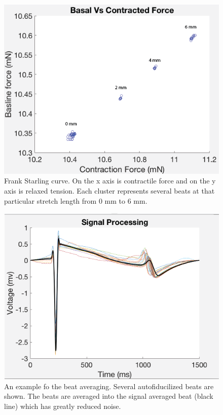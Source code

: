 \documentclass[12pt]{article}
\begin{document}
\begin{figure}[H]
	\label{fig:FSCurve}
	\centering
	\includegraphics[width = .95\textwidth]{Figures/FSCurve.png}
	\caption{Frank Starling curve. On the x axis is contractile force and on the y axis is relaxed tension. Each cluster represents several beats at that particular stretch length from 0 mm to 6 mm. }
\end{figure}




\begin{figure}[H]
	\label{fig:SignalProcessing}
	\centering
	\includegraphics[width = .95\textwidth]{Figures/SP.png}
	\caption{An example fo the beat averaging. Several autofiducilized beats are shown. The beats are averaged into the signal averaged beat (black line) which has greatly reduced noise. }
\end{figure}
\end{document}
